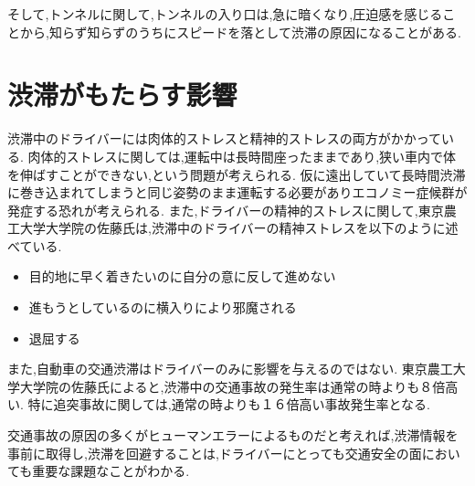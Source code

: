 そして,トンネルに関して,トンネルの入り口は,急に暗くなり,圧迫感を感じることから,知らず知らずのうちにスピードを落として渋滞の原因になることがある\cite{zurich}.

\newpage


\section{渋滞がもたらす影響}
渋滞中のドライバーには肉体的ストレスと精神的ストレスの両方がかかっている.
肉体的ストレスに関しては,運転中は長時間座ったままであり,狭い車内で体を伸ばすことができない,という問題が考えられる.
仮に遠出していて長時間渋滞に巻き込まれてしまうと同じ姿勢のまま運転する必要がありエコノミー症候群が発症する恐れが考えられる.
また,ドライバーの精神的ストレスに関して,東京農工大学大学院の佐藤氏\cite{alma99344256104031}は,渋滞中のドライバーの精神ストレスを以下のように述べている.


\begin{itemize}
  \item 目的地に早く着きたいのに自分の意に反して進めない \\
  \item 進もうとしているのに横入りにより邪魔される \\
  \item 退屈する \\
\end{itemize}



また,自動車の交通渋滞はドライバーのみに影響を与えるのではない.
東京農工大学大学院の佐藤氏によると,渋滞中の交通事故の発生率は通常の時よりも８倍高い\cite{alma99344256104031}.
特に追突事故に関しては,通常の時よりも１６倍高い事故発生率となる.

交通事故の原因の多くがヒューマンエラーによるものだと考えれば,渋滞情報を事前に取得し,渋滞を回避することは,ドライバーにとっても交通安全の面においても重要な課題なことがわかる.

\newpage

